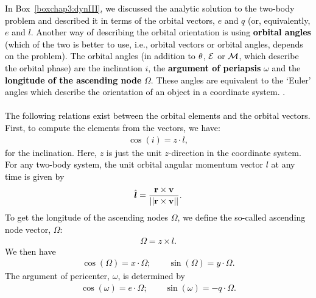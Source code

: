 \documentclass[main.tex]{subfiles}
\begin{document}
\begin{tcolorbox}[sharp corners, colback=green!30, colframe=green!80!blue, title=Box \refstepcounter{educhap3}\label{boxchap3:dynIV}\ref{boxchap3:dynIV} -- Orbital Dynamics IV]
\par \textcolor{black}{In Box~\ref{boxchap3:dynIII}, we discussed the analytic solution to the two-body problem and described it in terms of the orbital vectors, $\unit{e}$ and $\unit{q}$ (or, equivalently, $\unit{e}$ and $\unit{l}$. Another way of describing the orbital orientation is using {\bf orbital angles} (which of the two is better to use, i.e., orbital vectors or orbital angles, depends on the problem). The orbital angles (in addition to $\theta$, $\mathcal{E}$ or $\mathcal{M}$, which describe the orbital phase) are the inclination $i$, the {\bf argument of periapsis} $\omega$ and the {\bf longitude of the ascending node} $\Omega$. These angles are equivalent to the `Euler' angles which describe the orientation of an object in a coordinate system. . \\ \\
The following relations exist between the orbital elements and the orbital vectors. First, to compute the elements from the vectors, we have:
\begin{align}
\cos(i) = \unit{z} \cdot \unit{l},
\end{align}
for the inclination. Here, $\unit{z}$ is just the unit $z$-direction in the coordinate system. For any two-body system, the unit orbital angular momentum vector $\unit{l}$ at any time is given by
\begin{align}
\hat{\boldsymbol{l}} = \frac{ {\mathbf{r}} \times {\mathbf{v}}}{||{\mathbf{r}} \times {\mathbf{v}} ||}.
\end{align}
To get the longitude of the ascending nodes $\Omega$, we define the so-called ascending node vector, $\unit{\Omega}$:
\begin{align}
\unit{\Omega} = \unit{z} \times \unit{l}.
\end{align}
We then have
\begin{align}
\cos(\Omega) = \unit{x} \cdot \unit{\Omega}; \qquad \sin(\Omega) = \unit{y} \cdot \unit{\Omega}.
\end{align}
The argument of pericenter, $\omega$, is determined by
\begin{align}
\cos(\omega) = \unit{e} \cdot \unit{\Omega}; \qquad \sin(\omega) = -\unit{q} \cdot \unit{\Omega}.
\end{align}
}
\end{tcolorbox}
\end{document}
